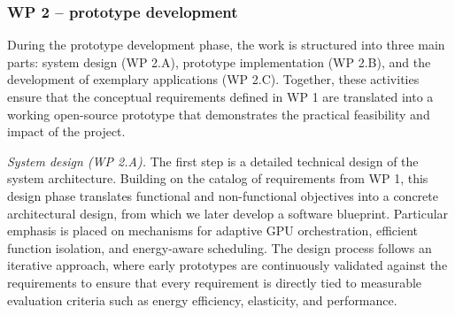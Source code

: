 \subsubsection{WP 2 -- prototype development}

During the prototype development phase, the work is structured into three main parts: system design (WP 2.A), prototype implementation (WP 2.B), and the development of exemplary applications (WP 2.C).
Together, these activities ensure that the conceptual requirements defined in WP 1 are translated into a working open-source prototype that demonstrates the practical feasibility and impact of the project.

\emph{System design (WP 2.A).}
The first step is a detailed technical design of the system architecture.
Building on the catalog of requirements from WP 1, this design phase translates functional and non-functional objectives into a concrete architectural design, from which we later develop a software blueprint.
Particular emphasis is placed on mechanisms for adaptive GPU orchestration, efficient function isolation, and energy-aware scheduling.
The design process follows an iterative approach, where early prototypes are continuously validated against the requirements to ensure that every requirement is directly tied to measurable evaluation criteria such as energy efficiency, elasticity, and performance.

